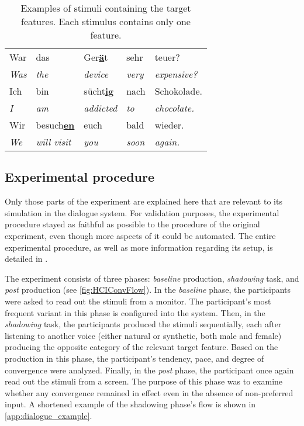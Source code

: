 \begin{table}[t]
	\centering
	\begin{tabularx}{\linewidth}{@{}*{5}{l}}
		\toprule
		
		War          	& das          			& Ger\textbf{\underline{ä}}t	& sehr          	& teuer? \\
		\emph{Was} 		& \emph{the} 			& \emph{device}           		& \emph{very} 		& \emph{expensive?} \\[0.1cm]
		
		Ich          	& bin         			& sücht\textbf{\underline{ig}}	& nach				& Schokolade. \\
		\emph{I}   		& \emph{am} 			& \emph{addicted}				& \emph{to} 		& \emph{chocolate.} \\[0.1cm]
		
		Wir         	& besuch\textbf{\underline{en}} 						& euch				& bald          & wieder. \\
		\emph{We} 		& \emph{will visit}		& \emph{you} 					& \emph{soon} 		& \emph{again.} \\
		
		\bottomrule
	\end{tabularx}
	\caption[Example sentence for selected phonetic features]{Examples of stimuli containing the target features. Each stimulus contains only one feature.}
	\label{tab:target_features}
\end{table}

\subsection{Experimental procedure}
\label{subsec:experimental_procedure}

Only those parts of the experiment are explained here that are relevant to its simulation in the dialogue system.
For validation purposes, the experimental procedure stayed as faithful as possible to the procedure of the original experiment, even though more aspects of it could be automated.
The entire experimental procedure, as well as more information regarding its setup, is detailed in \citet{Gessinger2017Interspeech}.

The experiment consists of three phases: \emph{baseline} production, \emph{shadowing} task, and \emph{post} production (see \cref{fig:HCIConvFlow}).
In the \emph{baseline} phase, the participants were asked to read out the stimuli from a monitor.
The participant's most frequent variant in this phase is configured into the system.
Then, in the \emph{shadowing} task, the participants produced the stimuli sequentially, each after listening to another voice (either natural or synthetic, both male and female) producing the opposite category of the relevant target feature.
Based on the production in this phase, the participant's tendency, pace, and degree of convergence were analyzed.
Finally, in the \emph{post} phase, the participant once again read out the stimuli from a screen.
The purpose of this phase was to examine whether any convergence remained in effect even in the absence of non-preferred input.
A shortened example of the shadowing phase's flow is shown in \cref{app:dialogue_example}.

